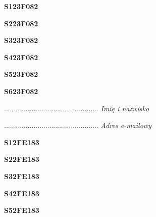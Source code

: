 \begin{turn}{90}\huge \textbf{S123F082}\end{turn}

\begin{turn}{90}\huge \textbf{S223F082}\end{turn}

\begin{turn}{90}\huge \textbf{S323F082}\end{turn}

\begin{turn}{90}\huge \textbf{S423F082}\end{turn}

\begin{turn}{90}\huge \textbf{S523F082}\end{turn}

\begin{turn}{90}\huge \textbf{S623F082}\end{turn}

\begin{turn}{90}\begin{minipage}{\linewidth} \vspace{20mm} ................................................  \textit{Imię i nazwisko}\end{minipage}\end{turn}

\begin{turn}{90}\begin{minipage}{\linewidth} \vspace{20mm} ................................................  \textit{Adres e-mailowy}\end{minipage}\end{turn}

\begin{turn}{90}\huge \textbf{S12FE183}\end{turn}

\begin{turn}{90}\huge \textbf{S22FE183}\end{turn}

\begin{turn}{90}\huge \textbf{S32FE183}\end{turn}

\begin{turn}{90}\huge \textbf{S42FE183}\end{turn}

\begin{turn}{90}\huge \textbf{S52FE183}\end{turn}

